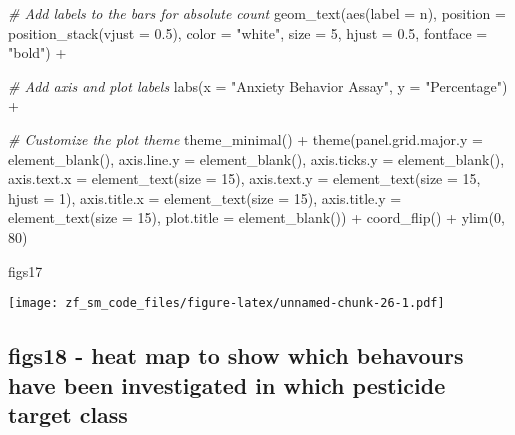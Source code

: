\documentclass[
]{article}
\newenvironment{Shaded}{\begin{snugshade}}{\end{snugshade}}
\newcommand{\AttributeTok}[1]{\textcolor[rgb]{0.77,0.63,0.00}{#1}}
\newcommand{\CommentTok}[1]{\textcolor[rgb]{0.56,0.35,0.01}{\textit{#1}}}
\newcommand{\DecValTok}[1]{\textcolor[rgb]{0.00,0.00,0.81}{#1}}
\newcommand{\FloatTok}[1]{\textcolor[rgb]{0.00,0.00,0.81}{#1}}
\newcommand{\FunctionTok}[1]{\textcolor[rgb]{0.00,0.00,0.00}{#1}}
\newcommand{\NormalTok}[1]{#1}
\newcommand{\SpecialCharTok}[1]{\textcolor[rgb]{0.00,0.00,0.00}{#1}}
\newcommand{\StringTok}[1]{\textcolor[rgb]{0.31,0.60,0.02}{#1}}
\begin{document}
\begin{Shaded}
\begin{Highlighting}[]
  \CommentTok{\# Add labels to the bars for absolute count  }
  \FunctionTok{geom\_text}\NormalTok{(}\FunctionTok{aes}\NormalTok{(}\AttributeTok{label =}\NormalTok{ n), }\AttributeTok{position =} \FunctionTok{position\_stack}\NormalTok{(}\AttributeTok{vjust =} \FloatTok{0.5}\NormalTok{), }\AttributeTok{color =} \StringTok{"white"}\NormalTok{, }\AttributeTok{size =} \DecValTok{5}\NormalTok{, }\AttributeTok{hjust =} \FloatTok{0.5}\NormalTok{, }\AttributeTok{fontface =} \StringTok{"bold"}\NormalTok{) }\SpecialCharTok{+}
  
  \CommentTok{\# Add axis and plot labels}
  \FunctionTok{labs}\NormalTok{(}\AttributeTok{x =} \StringTok{"Anxiety Behavior Assay"}\NormalTok{, }\AttributeTok{y =} \StringTok{"Percentage"}\NormalTok{) }\SpecialCharTok{+}
  
  \CommentTok{\# Customize the plot theme}
  \FunctionTok{theme\_minimal}\NormalTok{() }\SpecialCharTok{+}
  \FunctionTok{theme}\NormalTok{(}\AttributeTok{panel.grid.major.y =} \FunctionTok{element\_blank}\NormalTok{(),}
        \AttributeTok{axis.line.y =} \FunctionTok{element\_blank}\NormalTok{(),}
        \AttributeTok{axis.ticks.y =} \FunctionTok{element\_blank}\NormalTok{(),}
        \AttributeTok{axis.text.x =} \FunctionTok{element\_text}\NormalTok{(}\AttributeTok{size =} \DecValTok{15}\NormalTok{),}
        \AttributeTok{axis.text.y =} \FunctionTok{element\_text}\NormalTok{(}\AttributeTok{size =} \DecValTok{15}\NormalTok{, }\AttributeTok{hjust =} \DecValTok{1}\NormalTok{),}
        \AttributeTok{axis.title.x =} \FunctionTok{element\_text}\NormalTok{(}\AttributeTok{size =} \DecValTok{15}\NormalTok{),}
        \AttributeTok{axis.title.y =} \FunctionTok{element\_text}\NormalTok{(}\AttributeTok{size =} \DecValTok{15}\NormalTok{),}
        \AttributeTok{plot.title =} \FunctionTok{element\_blank}\NormalTok{()) }\SpecialCharTok{+}
        \FunctionTok{coord\_flip}\NormalTok{() }\SpecialCharTok{+}
        \FunctionTok{ylim}\NormalTok{(}\DecValTok{0}\NormalTok{, }\DecValTok{80}\NormalTok{)}

\NormalTok{figs17}
\end{Highlighting}
\end{Shaded}

\texttt{[image: zf\_sm\_code\_files/figure-latex/unnamed-chunk-26-1.pdf]}

\hypertarget{figs18---heat-map-to-show-which-behavours-have-been-investigated-in-which-pesticide-target-class}{%
\subsection{figs18 - heat map to show which behavours have been
investigated in which pesticide target
class}\label{figs18---heat-map-to-show-which-behavours-have-been-investigated-in-which-pesticide-target-class}}
\end{document}
